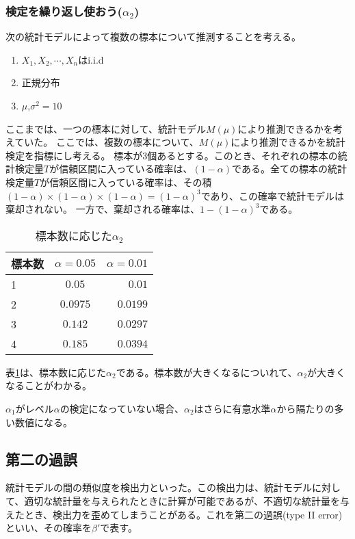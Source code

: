 \documentclass[a4paper,11pt,dvipdfmx]{jsarticle}
\begin{document}
\subsubsection{検定を繰り返し使おう($\alpha_2$)}
次の統計モデルによって複数の標本について推測することを考える。
\begin{enumerate}
    \item $X_1,X_2,\cdots,X_n $はi.i.d
    \item 正規分布
    \item $\mu$,$\sigma^2=10$
\end{enumerate}
ここまでは、一つの標本に対して、統計モデル$M(\mu)$により推測できるかを考えていた。
ここでは、複数の標本について、$M(\mu)$により推測できるかを統計検定を指標にし考える。
標本が$3$個あるとする。このとき、それぞれの標本の統計検定量$T$が信頼区間に入っている確率は、$(1-\alpha)$である。全ての標本の統計検定量$T$が信頼区間に入っている確率は、その積$(1-\alpha)\times(1-\alpha)\times(1-\alpha)=(1-\alpha)^3$であり、この確率で統計モデルは棄却されない。
一方で、棄却される確率は、$1-(1-\alpha)^3$である。
\begin{table}[hbtp]
    \caption{標本数に応じた$\alpha_2$}
    \label{table:multiple_test_reject_prob}
    \centering
    \begin{tabular}{lcr}
      \hline
      標本数  & $\alpha=0.05$  &  $\alpha=0.01$ \\
      \hline \hline
       1 & $0.05$  & $0.01$ \\
       2 & $0.0975$ & $0.0199$\\
       3 & $0.142$ & $0.0297$\\
       4 & $0.185$ & $0.0394$\\
    \end{tabular}
  \end{table}
表\ref{table:multiple_test_reject_prob}は、標本数に応じた$\alpha_2$である。標本数が大きくなるについれて、$\alpha_2$が大きくなることがわかる。

$\alpha_1$がレベル$\alpha$の検定になっていない場合、$\alpha_2$はさらに有意水準$\alpha$から隔たりの多い数値になる。




\subsection{第二の過誤}
統計モデルの間の類似度を検出力といった。この検出力は、統計モデルに対して、適切な統計量を与えられたときに計算が可能であるが、不適切な統計量を与えたとき、検出力を歪めてしまうことがある。これを第二の過誤(type II error)といい、その確率を$\beta'$で表す。
\end{document}
